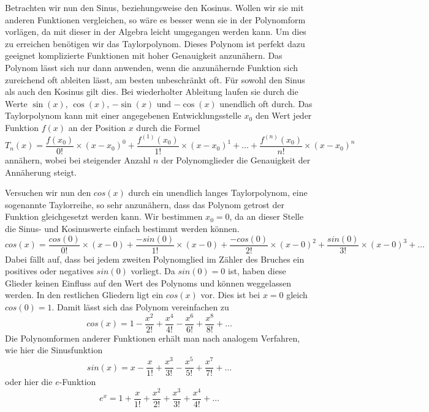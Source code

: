 \documentclass[a4paper,12pt]{article} %
\begin{document}
Betrachten wir nun den Sinus, beziehungsweise den Kosinus.
Wollen wir sie mit anderen Funktionen vergleichen, so wäre es besser wenn sie in der Polynomform vorlägen, da mit dieser in der Algebra leicht umgegangen werden kann.
Um dies zu erreichen benötigen wir das Taylorpolynom.
Dieses Polynom ist perfekt dazu geeignet komplizierte Funktionen mit hoher Genauigkeit anzunähern.
Das Polynom lässt sich nur dann anwenden, wenn die anzunähernde Funktion sich zureichend oft ableiten lässt, am besten unbeschränkt oft.
Für sowohl den Sinus als auch den Kosinus gilt dies.
Bei wiederholter Ableitung laufen sie durch die Werte $\sin(x)$, $\cos(x)$, $-\sin(x)$ und $-\cos(x)$ unendlich oft durch.
Das Taylorpolynom kann mit einer angegebenen Entwicklungsstelle $x_0$ den Wert jeder Funktion $f(x)$ an der Position $x$ durch die Formel
\begin{equation}
	T_n(x)=\frac{f(x_0)}{0!}\times(x-x_0)^0 + \frac{f^{(1)}(x_0)}{1!}\times(x-x_0)^1 +%
	\dots +\frac{f^{(n)}(x_0)}{n!}\times(x-x_0)^n
\end{equation} %
annähern, wobei bei steigender Anzahl $n$ der Polynomglieder die Genauigkeit der Annäherung steigt.

Versuchen wir nun den $cos(x)$ durch ein unendlich langes Taylorpolynom, eine sogenannte Taylorreihe, so sehr anzunähern, dass das Polynom getrost der Funktion gleichgesetzt werden kann.
Wir bestimmen $x_0=0$, da an dieser Stelle die Sinus- und Kosinuswerte einfach bestimmt werden können.
\[cos(x)=\frac{cos(0)}{0!}\times(x-0) + \frac{-sin(0)}{1!}\times(x-0) + \frac{-cos(0)}{2!}\times(x-0)^2+\frac{sin(0)}{3!}\times(x-0)^3+\dots\]
Dabei fällt auf, dass bei jedem zweiten Polynomglied im Zähler des Bruches ein positives oder negatives $sin(0)$ vorliegt.
Da $sin(0)=0$ ist, haben diese Glieder keinen Einfluss auf den Wert des Polynoms und können weggelassen werden. In den restlichen Gliedern ligt ein $cos(x)$ vor. Dies ist bei $x=0$ gleich $cos(0)=1$. Damit lässt sich das Polynom vereinfachen zu
\[cos(x)=1-\frac{x^2}{2!}+\frac{x^4}{4!}-\frac{x^6}{6!}+\frac{x^8}{8!}+\dots\]
Die Polynomformen anderer Funktionen erhält man nach analogem Verfahren, wie hier die Sinusfunktion
\[sin(x)=x-\frac{x}{1!}+\frac{x^3}{3!}-\frac{x^5}{5!}+\frac{x^7}{7!}+\dots\]
oder hier die $e$-Funktion
\[e^x=1+\frac{x}{1!}+\frac{x^2}{2!}+\frac{x^3}{3!}+\frac{x^4}{4!}+\dots\]
\end{document}
